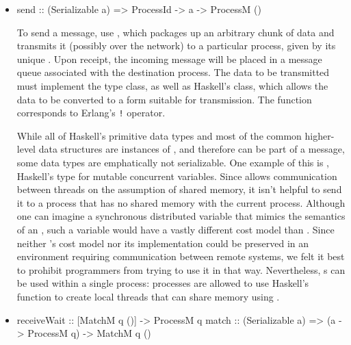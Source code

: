 \documentclass[preprint]{sigplanconf}
\begin{document}
\begin{itemize}
\item 
\begin{code}
send :: (Serializable a) => ProcessId -> a -> ProcessM ()
\end{code}

To send a message, use , which packages up an arbitrary chunk of data and transmits it (possibly over the network) to a particular process, given by its unique . Upon receipt, the incoming message will be placed in a message queue associated with the destination process. The data to be transmitted must implement the  type class, as well as Haskell's  class, which allows the data to be converted to a form suitable for transmission. The  function corresponds to Erlang's \texttt{!} operator.

While all of Haskell's primitive data types and most of the common higher-level data structures are instances of , and therefore can be part of a message, some data types are emphatically not serializable. One example of this is , Haskell's type for mutable concurrent variables. Since  allows communication between threads on the assumption of shared memory, it isn't helpful to send it to a process that has no shared memory with the current process. Although one can imagine a synchronous distributed variable that mimics the semantics of an , such a variable would have a vastly different cost model than . Since neither 's cost model nor its implementation could be preserved in an environment requiring communication between remote systems, we felt it best to prohibit programmers from trying to use it in that way. Nevertheless, s can be used within a single process: processes are allowed to use Haskell's  function to create local threads that can share memory using .

\item 
\begin{code}
receiveWait :: [MatchM q ()] -> ProcessM q
match :: (Serializable a) => (a -> ProcessM q) -> MatchM q ()
\end{code}


\end{itemize}
\end{document}
